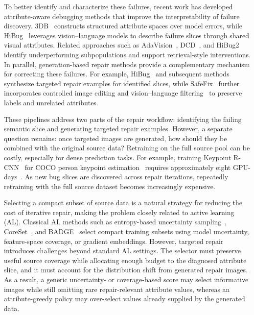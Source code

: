 \documentclass{article}
\newcommand{\safefix}{SafeFix\xspace}
\newcommand{\hibug}{HiBug\xspace}
\begin{document}
To better identify and characterize these failures, recent work has developed attribute-aware debugging methods that improve the interpretability of failure discovery. 3DB~\citep{leclerc20213db} constructs structured attribute spaces over model errors, while \hibug~\citep{chen2023hibug} leverages vision--language models to describe failure slices through shared visual attributes. Related approaches such as AdaVision~\citep{gao2023adaptive}, DCD~\citep{singla2024data}, and HiBug2~\citep{chen2025hibug2} identify underperforming subpopulations and support retrieval-style interventions. In parallel, generation-based repair methods provide a complementary mechanism for correcting these failures. For example, \hibug~\citep{chen2023hibug} and subsequent methods~\citep{zhang2024distributionally,xu2025safefix} synthesize targeted repair examples for identified slices, while \safefix~\citep{xu2025safefix} further incorporates controlled image editing and vision--language filtering~\citep{wang2024finetuned,li2024self} to preserve labels and unrelated attributes.

These pipelines address two parts of the repair workflow: identifying the failing semantic slice and generating targeted repair examples. However, a separate question remains: once targeted images are generated, how should they be combined with the original source data? Retraining on the full source pool can be costly, especially for dense prediction tasks. For example, training Keypoint R-CNN~\citep{mask-rcnn-2017} for COCO person keypoint estimation~\citep{lin2014microsoft} requires approximately eight GPU-days~\citep{detectron2modelzoo}. As new bug slices are discovered across repair iterations, repeatedly retraining with the full source dataset becomes increasingly expensive.

Selecting a compact subset of source data is a natural strategy for reducing the cost of iterative repair, making the problem closely related to active learning (AL). Classical AL methods such as entropy-based uncertainty sampling~\citep{settles2009active}, CoreSet~\citep{sener2018active}, and BADGE~\citep{ash2020deep} select compact training subsets using model uncertainty, feature-space coverage, or gradient embeddings. However, targeted repair introduces challenges beyond standard AL settings. The selector must preserve useful source coverage while allocating enough budget to the diagnosed attribute slice, and it must account for the distribution shift from generated repair images. As a result, a generic uncertainty- or coverage-based score may select informative images while still omitting rare repair-relevant attribute values, whereas an attribute-greedy policy may over-select values already supplied by the generated data.
\end{document}
